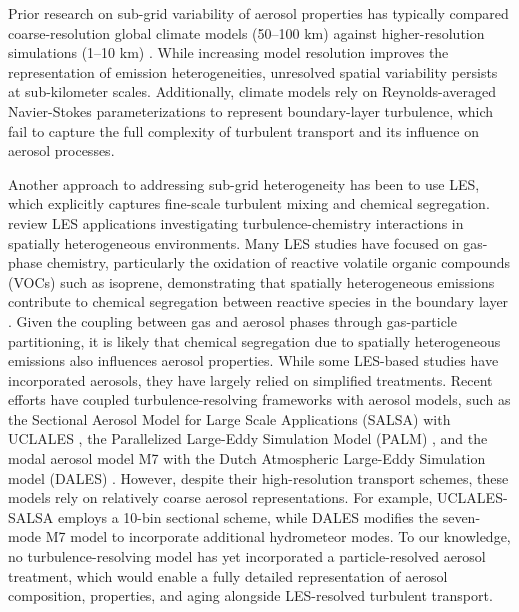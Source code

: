 \documentclass[journal abbreviation, manuscript]{copernicus}
\begin{document}
Prior research on sub-grid variability of aerosol properties has
typically compared coarse-resolution global climate models (50–100 km)
against higher-resolution simulations (1–10 km)
\citep{qian_investigation_2010, gustafson_jr_downscaling_2011,
  weigum_effect_2016, crippa_impact_2017,
  lin_quantification_2017}. While increasing model resolution improves
the representation of emission heterogeneities, unresolved spatial
variability persists at sub-kilometer scales. Additionally,
climate models rely on Reynolds-averaged Navier-Stokes
parameterizations to represent boundary-layer turbulence, which fail
to capture the full complexity of turbulent transport and its
influence on aerosol processes.

Another approach to addressing sub-grid heterogeneity has been to use
LES, which explicitly captures fine-scale turbulent mixing and
chemical segregation.  \citet{brasseur_segregation_2023} review LES
applications investigating turbulence-chemistry interactions in
spatially heterogeneous environments.  Many LES studies have focused
on gas-phase chemistry, particularly the oxidation of reactive
volatile organic compounds (VOCs) such as isoprene, demonstrating that
spatially heterogeneous emissions contribute to chemical segregation
between reactive species in the boundary layer
\citep{ouwersloot_segregation_2011, kaser_chemistry-turbulence_2015}.
Given the coupling between gas and aerosol phases through gas-particle
partitioning, it is likely that chemical segregation due to spatially
heterogeneous emissions also influences aerosol properties. While some
LES-based studies have incorporated aerosols, they have largely relied
on simplified treatments. Recent efforts have coupled
turbulence-resolving frameworks with aerosol models, such as the
Sectional Aerosol Model for Large Scale Applications (SALSA)
\citep{kokkola_salsa_2008} with UCLALES
\citep{tonttila_uclalessalsa_2017}, the Parallelized Large-Eddy
Simulation Model (PALM) \citep{kurppa_implementation_2019}, and the
modal aerosol model M7 \citep{vignati_m7_2004} with the Dutch
Atmospheric Large-Eddy Simulation model (DALES)
\citep{de_bruine_explicit_2019}. However, despite their
high-resolution transport schemes, these models rely on relatively
coarse aerosol representations. For example, UCLALES-SALSA employs a
10-bin sectional scheme, while DALES modifies the seven-mode M7 model
to incorporate additional hydrometeor modes. To our knowledge, no
turbulence-resolving model has yet incorporated a particle-resolved
aerosol treatment, which would enable a fully detailed representation
of aerosol composition, properties, and aging alongside LES-resolved
turbulent transport.
\end{document}

